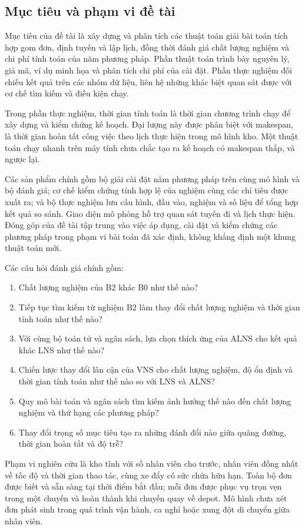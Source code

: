 \subsection{Mục tiêu và phạm vi đề tài}
Mục tiêu của đề tài là xây dựng và phân tích các thuật toán giải bài toán tích hợp gom đơn, định tuyến và lập lịch, đồng thời đánh giá chất lượng nghiệm và chi phí tính toán của năm phương pháp. Phần thuật toán trình bày nguyên lý, giả mã, ví dụ minh họa và phân tích chi phí của cài đặt. Phần thực nghiệm đối chiếu kết quả trên các nhóm dữ liệu, liên hệ những khác biệt quan sát được với cơ chế tìm kiếm và điều kiện chạy.

Trong phần thực nghiệm, thời gian tính toán là thời gian chương trình chạy để xây dựng và kiểm chứng kế hoạch. Đại lượng này được phân biệt với makespan, là thời gian hoàn tất công việc theo lịch thực hiện trong mô hình kho. Một thuật toán chạy nhanh trên máy tính chưa chắc tạo ra kế hoạch có makespan thấp, và ngược lại.

Các sản phẩm chính gồm bộ giải cài đặt năm phương pháp trên cùng mô hình và bộ đánh giá; cơ chế kiểm chứng tính hợp lệ của nghiệm cùng các chỉ tiêu được xuất ra; và bộ thực nghiệm lưu cấu hình, đầu vào, nghiệm và số liệu để tổng hợp kết quả so sánh. Giao diện mô phỏng hỗ trợ quan sát tuyến đi và lịch thực hiện. Đóng góp của đề tài tập trung vào việc áp dụng, cài đặt và kiểm chứng các phương pháp trong phạm vi bài toán đã xác định, không khẳng định một khung thuật toán mới.

Các câu hỏi đánh giá chính gồm:
\begin{enumerate}
\item Chất lượng nghiệm của B2 khác B0 như thế nào?
\item Tiếp tục tìm kiếm từ nghiệm B2 làm thay đổi chất lượng nghiệm và thời gian tính toán như thế nào?
\item Với cùng bộ toán tử và ngân sách, lựa chọn thích ứng của ALNS cho kết quả khác LNS như thế nào?
\item Chiến lược thay đổi lân cận của VNS cho chất lượng nghiệm, độ ổn định và thời gian tính toán như thế nào so với LNS và ALNS?
\item Quy mô bài toán và ngân sách tìm kiếm ảnh hưởng thế nào đến chất lượng nghiệm và thứ hạng các phương pháp?
\item Thay đổi trọng số mục tiêu tạo ra những đánh đổi nào giữa quãng đường, thời gian hoàn tất và độ trễ?
\end{enumerate}

Phạm vi nghiên cứu là kho tĩnh với số nhân viên cho trước, nhân viên đồng nhất về tốc độ và thời gian thao tác, cùng xe đẩy có sức chứa hữu hạn. Toàn bộ đơn được biết và sẵn sàng tại thời điểm bắt đầu; mỗi đơn được phục vụ trọn vẹn trong một chuyến và hoàn thành khi chuyến quay về depot. Mô hình chưa xét đơn phát sinh trong quá trình vận hành, ca nghỉ hoặc xung đột di chuyển giữa nhân viên.

